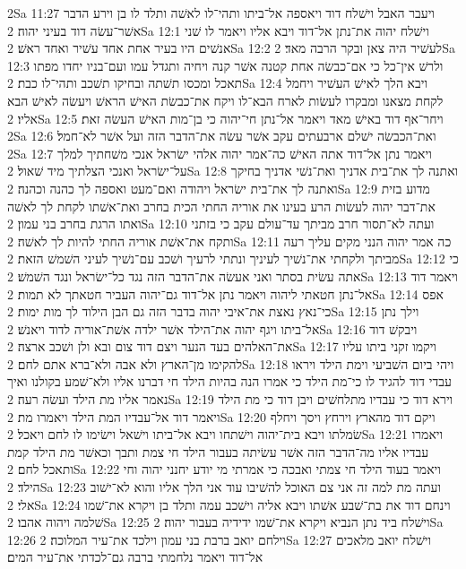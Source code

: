 2Sa 11:27  ויעבר האבל וישׁלח דוד ויאספה אל־ביתו ותהי־לו לאשׁה ותלד לו בן וירע הדבר אשׁר־עשׂה דוד בעיני יהוה׃
2Sa 12:1  וישׁלח יהוה את־נתן אל־דוד ויבא אליו ויאמר לו שׁני אנשׁים היו בעיר אחת אחד עשׁיר ואחד ראשׁ׃
2Sa 12:2  לעשׁיר היה צאן ובקר הרבה מאד׃
2Sa 12:3  ולרשׁ אין־כל כי אם־כבשׂה אחת קטנה אשׁר קנה ויחיה ותגדל עמו ועם־בניו יחדו מפתו תאכל ומכסו תשׁתה ובחיקו תשׁכב ותהי־לו כבת׃
2Sa 12:4  ויבא הלך לאישׁ העשׁיר ויחמל לקחת מצאנו ומבקרו לעשׂות לארח הבא־לו ויקח את־כבשׂת האישׁ הראשׁ ויעשׂה לאישׁ הבא אליו׃
2Sa 12:5  ויחר־אף דוד באישׁ מאד ויאמר אל־נתן חי־יהוה כי בן־מות האישׁ העשׂה זאת׃
2Sa 12:6  ואת־הכבשׂה ישׁלם ארבעתים עקב אשׁר עשׂה את־הדבר הזה ועל אשׁר לא־חמל׃
2Sa 12:7  ויאמר נתן אל־דוד אתה האישׁ כה־אמר יהוה אלהי ישׂראל אנכי משׁחתיך למלך על־ישׂראל ואנכי הצלתיך מיד שׁאול׃
2Sa 12:8  ואתנה לך את־בית אדניך ואת־נשׁי אדניך בחיקך ואתנה לך את־בית ישׂראל ויהודה ואם־מעט ואספה לך כהנה וכהנה׃
2Sa 12:9  מדוע בזית את־דבר יהוה לעשׂות הרע בעינו את אוריה החתי הכית בחרב ואת־אשׁתו לקחת לך לאשׁה ואתו הרגת בחרב בני עמון׃
2Sa 12:10  ועתה לא־תסור חרב מביתך עד־עולם עקב כי בזתני ותקח את־אשׁת אוריה החתי להיות לך לאשׁה׃
2Sa 12:11  כה אמר יהוה הנני מקים עליך רעה מביתך ולקחתי את־נשׁיך לעיניך ונתתי לרעיך ושׁכב עם־נשׁיך לעיני השׁמשׁ הזאת׃
2Sa 12:12  כי אתה עשׂית בסתר ואני אעשׂה את־הדבר הזה נגד כל־ישׂראל ונגד השׁמשׁ׃
2Sa 12:13  ויאמר דוד אל־נתן חטאתי ליהוה ויאמר נתן אל־דוד גם־יהוה העביר חטאתך לא תמות׃
2Sa 12:14  אפס כי־נאץ נאצת את־איבי יהוה בדבר הזה גם הבן הילוד לך מות ימות׃
2Sa 12:15  וילך נתן אל־ביתו ויגף יהוה את־הילד אשׁר ילדה אשׁת־אוריה לדוד ויאנשׁ׃
2Sa 12:16  ויבקשׁ דוד את־האלהים בעד הנער ויצם דוד צום ובא ולן ושׁכב ארצה׃
2Sa 12:17  ויקמו זקני ביתו עליו להקימו מן־הארץ ולא אבה ולא־ברא אתם לחם׃
2Sa 12:18  ויהי ביום השׁביעי וימת הילד ויראו עבדי דוד להגיד לו כי־מת הילד כי אמרו הנה בהיות הילד חי דברנו אליו ולא־שׁמע בקולנו ואיך נאמר אליו מת הילד ועשׂה רעה׃
2Sa 12:19  וירא דוד כי עבדיו מתלחשׁים ויבן דוד כי מת הילד ויאמר דוד אל־עבדיו המת הילד ויאמרו מת׃
2Sa 12:20  ויקם דוד מהארץ וירחץ ויסך ויחלף שׂמלתו ויבא בית־יהוה וישׁתחו ויבא אל־ביתו וישׁאל וישׂימו לו לחם ויאכל׃
2Sa 12:21  ויאמרו עבדיו אליו מה־הדבר הזה אשׁר עשׂיתה בעבור הילד חי צמת ותבך וכאשׁר מת הילד קמת ותאכל לחם׃
2Sa 12:22  ויאמר בעוד הילד חי צמתי ואבכה כי אמרתי מי יודע יחנני יהוה וחי הילד׃
2Sa 12:23  ועתה מת למה זה אני צם האוכל להשׁיבו עוד אני הלך אליו והוא לא־ישׁוב אלי׃
2Sa 12:24  וינחם דוד את בת־שׁבע אשׁתו ויבא אליה וישׁכב עמה ותלד בן ויקרא את־שׁמו שׁלמה ויהוה אהבו׃
2Sa 12:25  וישׁלח ביד נתן הנביא ויקרא את־שׁמו ידידיה בעבור יהוה׃
2Sa 12:26  וילחם יואב ברבת בני עמון וילכד את־עיר המלוכה׃
2Sa 12:27  וישׁלח יואב מלאכים אל־דוד ויאמר נלחמתי ברבה גם־לכדתי את־עיר המים׃
